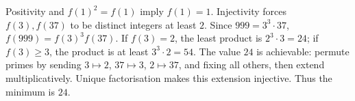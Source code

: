 Positivity and $f(1)^2=f(1)$ imply $f(1)=1$. Injectivity forces $f(3),f(37)$ to be distinct integers at least $2$. Since $999=3^3\cdot37$, $f(999)=f(3)^3f(37)$. If $f(3)=2$, the least product is $2^3\cdot3=24$; if $f(3)\ge3$, the product is at least $3^3\cdot2=54$. The value $24$ is achievable: permute primes by sending $3\mapsto2$, $37\mapsto3$, $2\mapsto37$, and fixing all others, then extend multiplicatively. Unique factorisation makes this extension injective. Thus the minimum is $\boxed{24}$.

